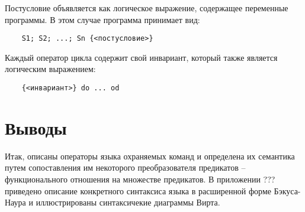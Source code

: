Постусловие объявляется как логическое выражение, содержащее переменные программы. В этом случае программа
принимает вид:
\begin{verbatim}
	S1; S2; ...; Sn {<постусловие>}
\end{verbatim}

Каждый оператор цикла содержит свой инвариант, который также является логическим выражением:
\begin{verbatim}
	{<инвариант>} do ... od
\end{verbatim}

\section{Выводы} \label{ch2:conclusion}
Итак, описаны операторы языка охраняемых команд и определена их семантика путем
сопоставления им некоторого преобразователя предикатов -- функционального отношения на множестве предикатов.
В приложении ??? приведено описание конкретного синтаксиса языка в расширенной форме Бэкуса-Наура и
иллюстрированы синтаксичекие диаграммы Вирта.
%
